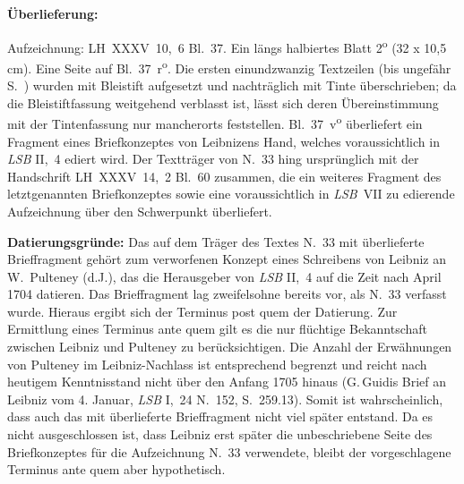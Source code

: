 %
%
%
%
%
\frenchspacing%
%
\begin{ledgroupsized}[r]{120mm}%
\footnotesize%
\pstart%
\noindent\textbf{Überlieferung:}%
\pend%
\end{ledgroupsized}%
\begin{ledgroupsized}[r]{114mm}%
\footnotesize%
\pstart \parindent -6mm
%
Aufzeichnung:
LH~XXXV~10,~6 Bl.~37.
Ein längs halbiertes Blatt 2\textsuperscript{o} (32 x 10,5 cm).
Eine Seite auf Bl.~37~r\textsuperscript{o}\!.
Die ersten einundzwanzig Textzeilen
(bis ungefähr S.~)
wurden mit Bleistift aufgesetzt und nachträglich mit Tinte überschrieben;
da die Bleistiftfassung weitgehend verblasst ist,
lässt sich deren Übereinstimmung mit der Tintenfassung nur man\-cher\-orts feststellen.
Bl.~37~v\textsuperscript{o}\! überliefert ein Fragment eines Brief\-kon\-zep\-tes von Leibnizens Hand,
welches voraussichtlich in \textit{LSB} II,~4 ediert wird.
Der Text\-trä\-ger von N.~33 hing ursprünglich mit der Handschrift LH~XXXV~14,~2 Bl.~60 zusammen,
die ein weiteres Fragment des letztgenannten Briefkonzeptes sowie eine voraussichtlich in \textit{LSB}~VII zu edierende Aufzeichnung über den Schwerpunkt überliefert.
\pend%
\end{ledgroupsized}%
%
\vspace{8mm}%
\begin{ledgroup}%
\footnotesize%
\pstart%
\noindent\footnotesize{\textbf{Datierungsgründe:}\label{LH_35_10_06_037_datierung_rhtj}
Das auf dem Träger des Textes N.~33 mit überlieferte Brieffragment gehört zum verworfenen Konzept eines Schreibens von Leibniz an W.~Pulteney (d.J.), das die Herausgeber von \textit{LSB} II,~4 auf die Zeit nach April 1704 datieren.\protect{}}
Das Brieffragment lag zweifelsohne bereits vor, als N.~33 verfasst wurde.
Hieraus ergibt sich der Terminus post quem der Datierung.
Zur Ermittlung eines Terminus ante quem gilt es die nur flüchtige Bekanntschaft zwischen Leibniz und Pulteney zu berücksichtigen.
Die Anzahl der Erwähnungen von Pulteney im Leibniz-Nachlass ist entsprechend begrenzt und reicht nach heutigem Kenntnisstand nicht über den Anfang 1705 hinaus (G.\,Guidis Brief an Leibniz vom 4. Januar, \textit{LSB} I,~24 N.~152, S.~259.13\cite{01342}).%
\protect{}
Somit ist wahrscheinlich, dass auch das mit überlieferte Brieffragment nicht viel später entstand.
Da es nicht ausgeschlossen ist, dass Leibniz erst später die unbeschriebene Seite des Briefkonzeptes für die Aufzeichnung N.~33 verwendete, bleibt der vorgeschlagene Terminus ante quem aber hypothetisch.
\pend%
\end{ledgroup}%
